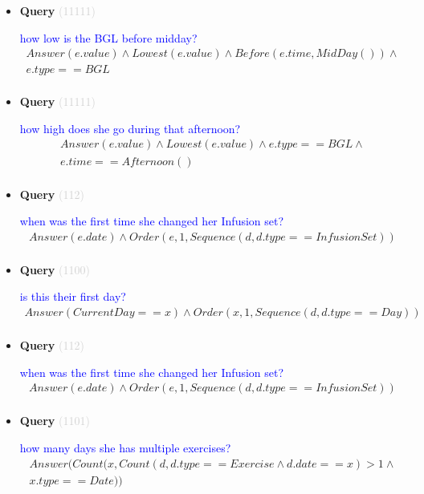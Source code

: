 \documentclass[11pt]{article}
\newcommand{\key}[1]{\textcolor{lightgray}{#1}}
\newcounter{CQuery}
\begin{document}
\begin{itemize}
\item
\textbf{Query\theCQuery} \key{(11111)} \addtocounter{CQuery}{1}
\textcolor{blue}{ how low is the BGL before midday? }
\begin{multline*}
Answer(e.value) \wedge Lowest(e.value) \wedge Before(e.time, MidDay()) \wedge \\ 
e.type==BGL \\ 
\end{multline*}


\item
\textbf{Query\theCQuery} \key{(11111)} \addtocounter{CQuery}{1}
\textcolor{blue}{ how high does she go during that afternoon? }
\begin{multline*}
Answer(e.value) \wedge Lowest(e.value) \wedge e.type==BGL \wedge \\ 
e.time==Afternoon() \\ 
\end{multline*}


\item
\textbf{Query\theCQuery} \key{(112)} \addtocounter{CQuery}{1}
\textcolor{blue}{ when was the first time she changed her Infusion set? }
\begin{multline*}
Answer(e.date) \wedge Order(e, 1, Sequence(d, d.type==InfusionSet)) \\ 
\end{multline*}


\item
\textbf{Query\theCQuery} \key{(1100)} \addtocounter{CQuery}{1}
\textcolor{blue}{ is this their first day? }
\begin{multline*}
Answer(CurrentDay==x) \wedge Order(x, 1, Sequence(d, d.type==Day)) \\ 
\end{multline*}


\item
\textbf{Query\theCQuery} \key{(112)} \addtocounter{CQuery}{1}
\textcolor{blue}{ when was the first time she changed her Infusion set? }
\begin{multline*}
Answer(e.date) \wedge Order(e, 1, Sequence(d, d.type==InfusionSet)) \\ 
\end{multline*}


\item
\textbf{Query\theCQuery} \key{(1101)} \addtocounter{CQuery}{1}
\textcolor{blue}{ how many days she has multiple exercises? }
\begin{multline*}
Answer(Count(x, Count(d, d.type==Exercise \wedge d.date==x)>1 \wedge \\ 
x.type==Date)) \\ 
\end{multline*}



\end{itemize}
\end{document}
